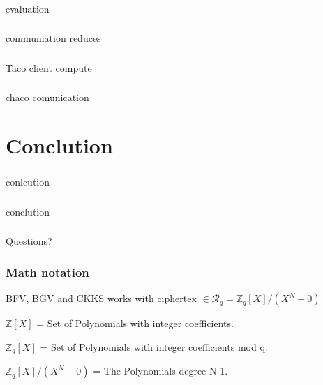 \documentclass[10pt,handout]{beamer}
\begin{document}
\begin{frame}
\frametitle{}
evaluation
\end{frame}



\begin{frame}
\frametitle{}
communiation reduces
\end{frame}



\begin{frame}
\frametitle{}
Taco client compute
\end{frame}



\begin{frame}
\frametitle{}
chaco comunication
\end{frame}

\section{Conclution}
\begin{frame}
\frametitle{}
conlcution
\end{frame}


\begin{frame}
\frametitle{}
conclution
\end{frame}


\begin{frame}
\frametitle{}
\Huge

\begin{center}
   Questions?
\end{center}
\end{frame}




\begin{frame}[noframenumbering]
\frametitle{Math notation}
BFV, BGV and CKKS works with ciphertex  $\in \mathcal{R}_q =\mathbb{Z}_q[X]/(X^N+0)$

$\mathbb{Z}[X]$ = Set of Polynomials with integer coefficients.

$\mathbb{Z}_q[X]$ = Set of Polynomials with integer coefficients mod q.

$\mathbb{Z}_q[X]/(X^N+0)$ = The Polynomials degree N-1.


\end{frame}
\end{document}
